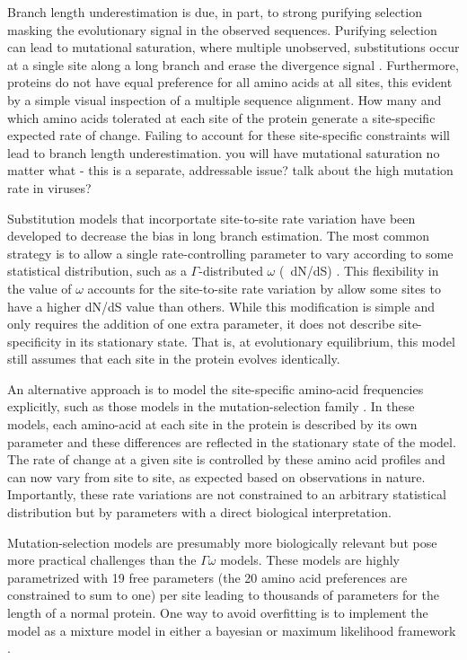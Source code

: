\documentclass[11pt]{article}
\newcommand\skhcomment[1]{{\color{magenta}#1}}
\begin{document}
Branch length underestimation is due, in part, to strong purifying selection masking the evolutionary signal in the observed sequences. 
Purifying selection can lead to mutational saturation, where multiple unobserved, substitutions occur at a single site along a long branch and erase the divergence signal \citep{holmes2003molecular}.
Furthermore, proteins do not have equal preference for all amino acids at all sites, this evident by a simple visual inspection of a multiple sequence alignment. 
How many and which amino acids tolerated at each site of the protein generate a site-specific expected rate of change. 
Failing to account for these site-specific constraints will lead to branch length underestimation. 
\skhcomment{you will have mutational saturation no matter what - this is a separate, addressable issue?}
\skhcomment{talk about the high mutation rate in viruses?}

Substitution models that incorportate site-to-site rate variation have been developed to decrease the bias in long branch estimation. 
The most common strategy is to allow a single rate-controlling parameter to vary according to some statistical distribution, such as a $\Gamma$-distributed $\omega$ (~dN/dS) \citep{yang2000codon}. 
This flexibility in the value of $\omega$ accounts for the site-to-site rate variation by allow some sites to have a higher dN/dS value than others. 
While this modification is simple and only requires the addition of one extra parameter, it does not describe site-specificity in its stationary state. 
That is, at evolutionary equilibrium, this model still assumes that each site in the protein evolves identically.  

An alternative approach is to model the site-specific amino-acid frequencies explicitly, such as those models in the mutation-selection family \citep{halpern1998evolutionary}. 
In these models, each amino-acid at each site in the protein is described by its own parameter and these differences are reflected in the stationary state of the model. 
The rate of change at a given site is controlled by these amino acid profiles and can now vary from site to site, as expected based on observations in nature. 
Importantly, these rate variations are not constrained to an arbitrary statistical distribution but by parameters with a direct biological interpretation. 

Mutation-selection models are presumably more biologically relevant but pose more practical challenges than the $\Gamma\omega$ models. 
These models are highly parametrized with 19 free parameters (the 20 amino acid preferences are constrained to sum to one) per site leading to thousands of parameters for the length of a normal protein. 
One way to avoid overfitting is to implement the model as a mixture model in either a bayesian \citep{lartillot2004bayesian} or maximum likelihood framework \citep{si2008empirical}. 
\end{document}
